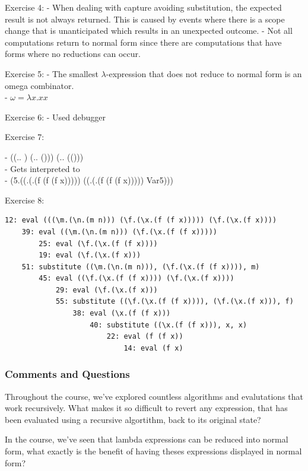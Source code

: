 \documentclass{article}
\theoremstyle{theorem}
\theoremstyle{definition}
\theoremstyle{remark}
\begin{document}
Exercise 4:
- When dealing with capture avoiding substitution, the expected result is not always returned. This is caused by events where there is a scope change that is unanticipated which results in an unexpected outcome.
- Not all computations return to normal form since there are computations that have forms where no reductions can occur.
  
Exercise 5:
  - The smallest $\lambda$-expression that does not reduce to normal form is an omega combinator. \\ 
    - $\omega = \lambda x.xx$ 

Exercise 6:
  - Used debugger

Exercise 7:
  \newcommand{\m}{\text{m}}
  \newcommand{\n}{\text{n}}
  \newcommand{\f}{\text{f}}
  \newcommand{\x}{}
  \newcommand{\Var}{\text{Var}}

  - ((\m.\n. \m \n) (\f.\x. \f (\f \x))) (\f.\x. \f (\f (\f \x))) \\ 
  - Gets interpreted to \\ 
  - (\Var5.((\f.(\x.(f (f (f x))))) ((\f.(\x.(f (f (f x))))) Var5)))

Exercise 8:
\begin{verbatim}
12: eval (((\m.(\n.(m n))) (\f.(\x.(f (f x))))) (\f.(\x.(f x))))
    39: eval ((\m.(\n.(m n))) (\f.(\x.(f (f x)))))
        25: eval (\f.(\x.(f (f x))))
        19: eval (\f.(\x.(f x)))
    51: substitute ((\m.(\n.(m n))), (\f.(\x.(f (f x)))), m)
        45: eval ((\f.(\x.(f (f x)))) (\f.(\x.(f x))))
            29: eval (\f.(\x.(f x)))
            55: substitute ((\f.(\x.(f (f x)))), (\f.(\x.(f x))), f)
                38: eval (\x.(f (f x)))
                    40: substitute ((\x.(f (f x))), x, x)
                        22: eval (f (f x))
                            14: eval (f x)
\end{verbatim}

\subsubsection*{Comments and Questions}

Throughout the course, we've explored countless algorithms and evalutations that work recursively. What makes it so difficult to revert any expression, that has been evaluated using a recursive algortithm, back to its original state?

In the course, we've seen that lambda expressions can be reduced into normal form, what exactly is the benefit of having theses expressions displayed in normal form?
\end{document}
